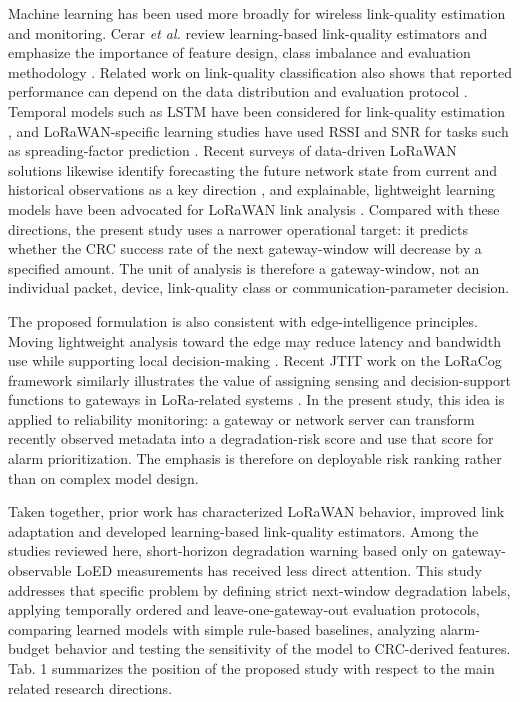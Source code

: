 \documentclass{jot}
\begin{document}
Machine learning has been used more broadly for wireless link-quality estimation and monitoring. Cerar \textit{et al.} review learning-based link-quality estimators and emphasize the importance of feature design, class imbalance and evaluation methodology \cite{10}. Related work on link-quality classification also shows that reported performance can depend on the data distribution and evaluation protocol \cite{11}. Temporal models such as LSTM have been considered for link-quality estimation \cite{12}, and LoRaWAN-specific learning studies have used RSSI and SNR for tasks such as spreading-factor prediction \cite{13}. Recent surveys of data-driven LoRaWAN solutions likewise identify forecasting the future network state from current and historical observations as a key direction \cite{14}, and explainable, lightweight learning models have been advocated for LoRaWAN link analysis \cite{15}. Compared with these directions, the present study uses a narrower operational target: it predicts whether the CRC success rate of the next gateway-window will decrease by a specified amount. The unit of analysis is therefore a gateway-window, not an individual packet, device, link-quality class or communication-parameter decision.

The proposed formulation is also consistent with edge-intelligence principles. Moving lightweight analysis toward the edge may reduce latency and bandwidth use while supporting local decision-making \cite{16}. Recent JTIT work on the LoRaCog framework similarly illustrates the value of assigning sensing and decision-support functions to gateways in LoRa-related systems \cite{17}. In the present study, this idea is applied to reliability monitoring: a gateway or network server can transform recently observed metadata into a degradation-risk score and use that score for alarm prioritization. The emphasis is therefore on deployable risk ranking rather than on complex model design.

Taken together, prior work has characterized LoRaWAN behavior, improved link adaptation and developed learning-based link-quality estimators. Among the studies reviewed here, short-horizon degradation warning based only on gateway-observable LoED measurements has received less direct attention. This study addresses that specific problem by defining strict next-window degradation labels, applying temporally ordered and leave-one-gateway-out evaluation protocols, comparing learned models with simple rule-based baselines, analyzing alarm-budget behavior and testing the sensitivity of the model to CRC-derived features. Tab. 1 summarizes the position of the proposed study with respect to the main related research directions.
\end{document}
